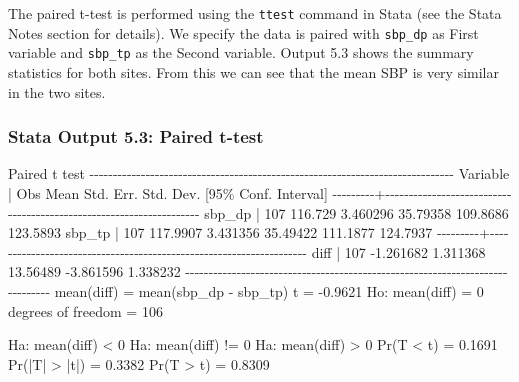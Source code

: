 \documentclass[
]{memoir}
\newenvironment{Shaded}{\begin{snugshade}}{\end{snugshade}}
\newcommand{\NormalTok}[1]{#1}
\begin{document}
The paired t-test is performed using the \texttt{ttest} command in Stata (see the Stata Notes section for details). We specify the data is paired with \texttt{sbp\_dp} as First variable and \texttt{sbp\_tp} as the Second variable. Output 5.3 shows the summary statistics for both sites. From this we can see that the mean SBP is very similar in the two sites.

\hypertarget{stata-output-5.3-paired-t-test}{%
\subsubsection*{Stata Output 5.3: Paired t-test}\label{stata-output-5.3-paired-t-test}}

\begin{Shaded}
\begin{Highlighting}[]
\NormalTok{Paired t test}
\NormalTok{{-}{-}{-}{-}{-}{-}{-}{-}{-}{-}{-}{-}{-}{-}{-}{-}{-}{-}{-}{-}{-}{-}{-}{-}{-}{-}{-}{-}{-}{-}{-}{-}{-}{-}{-}{-}{-}{-}{-}{-}{-}{-}{-}{-}{-}{-}{-}{-}{-}{-}{-}{-}{-}{-}{-}{-}{-}{-}{-}{-}{-}{-}{-}{-}{-}{-}{-}{-}{-}{-}{-}{-}{-}{-}{-}{-}{-}{-}}
\NormalTok{Variable |     Obs        Mean    Std. Err.   Std. Dev.   [95\% Conf. Interval]}
\NormalTok{{-}{-}{-}{-}{-}{-}{-}{-}{-}+{-}{-}{-}{-}{-}{-}{-}{-}{-}{-}{-}{-}{-}{-}{-}{-}{-}{-}{-}{-}{-}{-}{-}{-}{-}{-}{-}{-}{-}{-}{-}{-}{-}{-}{-}{-}{-}{-}{-}{-}{-}{-}{-}{-}{-}{-}{-}{-}{-}{-}{-}{-}{-}{-}{-}{-}{-}{-}{-}{-}{-}{-}{-}{-}{-}{-}{-}{-}}
\NormalTok{  sbp\_dp |     107     116.729    3.460296    35.79358    109.8686    123.5893}
\NormalTok{  sbp\_tp |     107    117.9907    3.431356    35.49422    111.1877    124.7937}
\NormalTok{{-}{-}{-}{-}{-}{-}{-}{-}{-}+{-}{-}{-}{-}{-}{-}{-}{-}{-}{-}{-}{-}{-}{-}{-}{-}{-}{-}{-}{-}{-}{-}{-}{-}{-}{-}{-}{-}{-}{-}{-}{-}{-}{-}{-}{-}{-}{-}{-}{-}{-}{-}{-}{-}{-}{-}{-}{-}{-}{-}{-}{-}{-}{-}{-}{-}{-}{-}{-}{-}{-}{-}{-}{-}{-}{-}{-}{-}}
\NormalTok{    diff |     107   {-}1.261682    1.311368    13.56489   {-}3.861596    1.338232}
\NormalTok{{-}{-}{-}{-}{-}{-}{-}{-}{-}{-}{-}{-}{-}{-}{-}{-}{-}{-}{-}{-}{-}{-}{-}{-}{-}{-}{-}{-}{-}{-}{-}{-}{-}{-}{-}{-}{-}{-}{-}{-}{-}{-}{-}{-}{-}{-}{-}{-}{-}{-}{-}{-}{-}{-}{-}{-}{-}{-}{-}{-}{-}{-}{-}{-}{-}{-}{-}{-}{-}{-}{-}{-}{-}{-}{-}{-}{-}{-}}
\NormalTok{     mean(diff) = mean(sbp\_dp {-} sbp\_tp)                           t =  {-}0.9621}
\NormalTok{ Ho: mean(diff) = 0                              degrees of freedom =      106}

\NormalTok{ Ha: mean(diff) \textless{} 0           Ha: mean(diff) != 0           Ha: mean(diff) \textgreater{} 0}
\NormalTok{ Pr(T \textless{} t) = 0.1691         Pr(|T| \textgreater{} |t|) = 0.3382          Pr(T \textgreater{} t) = 0.8309}
\end{Highlighting}
\end{Shaded}
\end{document}
